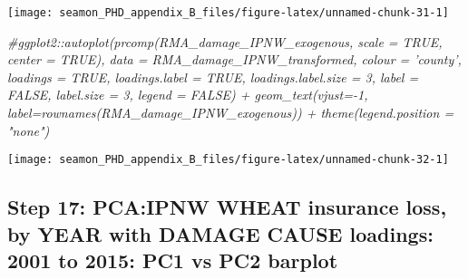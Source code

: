 \documentclass[]{article}
\newenvironment{Shaded}{\begin{snugshade}}{\end{snugshade}}
\newcommand{\CommentTok}[1]{\textcolor[rgb]{0.56,0.35,0.01}{\textit{#1}}}
\newcommand{\DataTypeTok}[1]{\textcolor[rgb]{0.13,0.29,0.53}{#1}}
\newcommand{\DecValTok}[1]{\textcolor[rgb]{0.00,0.00,0.81}{#1}}
\newcommand{\KeywordTok}[1]{\textcolor[rgb]{0.13,0.29,0.53}{\textbf{#1}}}
\newcommand{\NormalTok}[1]{#1}
\newcommand{\OperatorTok}[1]{\textcolor[rgb]{0.81,0.36,0.00}{\textbf{#1}}}
\newcommand{\StringTok}[1]{\textcolor[rgb]{0.31,0.60,0.02}{#1}}
\begin{document}
\texttt{[image: seamon\_PHD\_appendix\_B\_files/figure-latex/unnamed-chunk-31-1]}

\begin{Shaded}
\begin{Highlighting}[]
\CommentTok{#ggplot2::autoplot(prcomp(RMA_damage_IPNW_exogenous, scale = TRUE, center = TRUE), data = RMA_damage_IPNW_transformed, colour = 'county', loadings = TRUE, loadings.label = TRUE, loadings.label.size  = 3, label = FALSE, label.size = 3, legend = FALSE) + geom_text(vjust=-1, label=rownames(RMA_damage_IPNW_exogenous)) + theme(legend.position = "none")}
\end{Highlighting}
\end{Shaded}

\begin{Shaded}
\end{Shaded}

\texttt{[image: seamon\_PHD\_appendix\_B\_files/figure-latex/unnamed-chunk-32-1]}

\hypertarget{step-17-pcaipnw-wheat-insurance-loss-by-year-with-damage-cause-loadings-2001-to-2015-pc1-vs-pc2-barplot}{%
\subsection{Step 17: PCA:IPNW WHEAT insurance loss, by YEAR with DAMAGE
CAUSE loadings: 2001 to 2015: PC1 vs PC2
barplot}\label{step-17-pcaipnw-wheat-insurance-loss-by-year-with-damage-cause-loadings-2001-to-2015-pc1-vs-pc2-barplot}}
\end{document}
